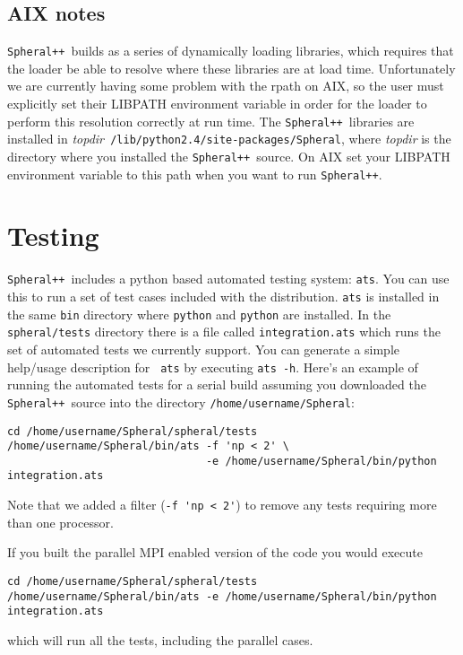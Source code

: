\documentclass{article}
\newcommand{\Spheral}{{\tt Spheral++}}
\begin{document}
\subsection{AIX notes}
\Spheral\ builds as a series of dynamically loading libraries, which requires
that the loader be able to resolve where these libraries are at load time.
Unfortunately we are currently having some problem with the rpath on AIX, so the
user must explicitly set their LIBPATH environment variable in order for the
loader to perform this resolution correctly at run time.  The
\Spheral\ libraries are installed in {\em topdir}{\tt
  /lib/python2.4/site-packages/Spheral}, where {\em topdir} is the directory
where you installed the \Spheral\ source.  On AIX set your LIBPATH environment
variable to this path when you want to run \Spheral.

\section{Testing}
\Spheral\ includes a python based automated testing system: \verb+ats+.  You
can use this to run a set of test cases included with the distribution.
\verb+ats+ is installed in the same \verb+bin+ directory where \verb+python+
and \verb+python+ are installed.  In the \verb+spheral/tests+ directory there is
a file called \verb+integration.ats+ which runs the set of automated tests we
currently support.  You can generate a simple help/usage description for {\tt
  ats} by executing \verb+ats -h+.  Here's an example of running the automated
tests for a serial build assuming you downloaded the \Spheral\ source into the
directory \verb+/home/username/Spheral+:
\begin{verbatim}
cd /home/username/Spheral/spheral/tests
/home/username/Spheral/bin/ats -f 'np < 2' \
                               -e /home/username/Spheral/bin/python integration.ats
\end{verbatim}
Note that we added a filter (\verb+-f 'np < 2'+) to remove any tests requiring
more than one processor.

If you built the parallel MPI enabled version of the code you would execute
\begin{verbatim}
cd /home/username/Spheral/spheral/tests
/home/username/Spheral/bin/ats -e /home/username/Spheral/bin/python integration.ats
\end{verbatim}
which will run all the tests, including the parallel cases.
\end{document}
